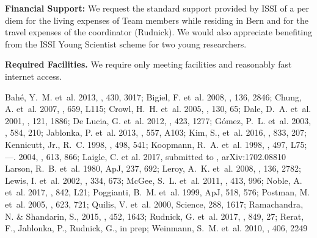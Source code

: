 \documentclass[11pt]{article}
\begin{document}
\textbf{Financial Support:} We request the standard support provided
by ISSI of a per diem for the living expenses of Team members while
residing in Bern and for the travel expenses of the coordinator
(Rudnick). We would also appreciate benefiting from the ISSI Young
Scientist scheme for two young researchers.  

\textbf{Required Facilities.}  We require only meeting facilities and
reasonably fast internet access.

\footnotesize{{Bah\'e}, Y.~M. {et~al.} 2013, \mnras, 430, 3017; 
{Bigiel}, F. {et~al.} 2008, \aj, 136, 2846; 
{Chung}, A. {et~al.} 2007, \apjl, 659, L115; 
{Crowl}, H.~H. {et~al.} 2005, \aj, 130, 65; 
{Dale}, D.~A. {et~al.} 2001, \aj, 121, 1886; 
{De Lucia}, G. {et~al.} 2012, \mnras, 423, 1277; 
{G{\' o}mez}, P.~L. {et~al.} 2003, \apj, 584, 210; 
{Jablonka}, P. {et~al.} 2013, \aap, 557, A103; 
{Kim}, S., et~al. 2016, \apj, 833, 207;
{Kennicutt}, Jr., R.~C. 1998, \apj, 498, 541; 
{Koopmann}, R.~A. {et~al.} 1998, \apjl, 497, L75; 
---. 2004, \apj, 613, 866; 
Laigle, C. et al. 2017, submitted to \mnras, arXiv:1702.08810
{Larson}, R.~B. {et~al.} 1980, ApJ, 237, 692; 
{Leroy}, A.~K. {et~al.} 2008, \aj, 136, 2782; 
{Lewis}, I. {et~al.} 2002, \mnras, 334, 673; 
{McGee}, S.~L. {et~al.} 2011, \mnras, 413, 996; 
Noble, A. et~al. 2017, \apj, 842, L21;
{Poggianti}, B.~M. {et~al.} 1999, ApJ, 518, 576; 
{Postman}, M. {et~al.} 2005, \apj, 623, 721; 
{Quilis}, V. {et~al.} 2000, Science, 288, 1617; 
{Ramachandra}, N. \& {Shandarin}, S., 2015, \mnras, 452, 1643;
Rudnick, G. et~al. 2017, \apj, 849, 27;
{Rerat}, F., Jablonka, P., Rudnick, G., in prep;
{Weinmann}, S.~M. {et~al.} 2010, \mnras, 406, 2249}



\end{document}
